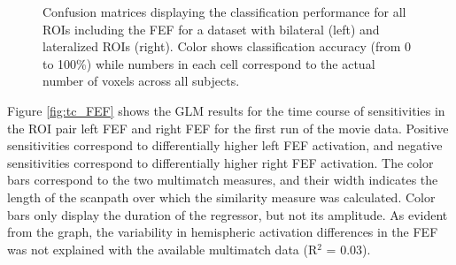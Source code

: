 \documentclass[a4paper, 12pt]{scrreprt}
\begin{document}
\begin{figure}[H]
	\caption[Classification results with the FEF]{{\small Confusion matrices displaying the classification performance for all ROIs including the FEF for a dataset with bilateral  (left) and lateralized ROIs (right). Color shows classification accuracy (from 0 to 100\%) while numbers in each cell correspond to the actual number of voxels	across all subjects.}}
	\label{fig:CV_FEF}
\end{figure}

Figure \ref{fig:tc_FEF} shows the GLM results for the time course of sensitivities in the ROI pair left FEF and right FEF for the first run of the movie data. Positive sensitivities correspond to differentially higher left FEF activation, and negative sensitivities correspond to differentially higher right FEF activation. The color bars correspond to the two multimatch measures, and their width indicates the length of the scanpath over which the similarity measure was calculated. Color bars only display the duration of the regressor, but not its amplitude. As evident from the graph, the variability in hemispheric activation differences in the FEF was not explained with the available multimatch data (R$^2$ = 0.03).
\end{document}
